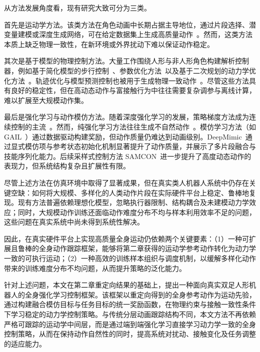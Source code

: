 从方法发展角度看，现有研究大致可分为三类。

首先是运动学方法。该类方法在角色动画中长期占据主导地位，通过片段选择、潜变量建模或深度生成网络，可在给定数据集上生成高质量动作~\cite{safonova2007construction,lee2010motion,agrawal2016task,ye2010synthesis,levine2012continuous}。然而，这类方法本质上缺乏物理一致性，在新环境或外界扰动下难以保证动作稳定。

其次是基于模型的物理控制方法。大量工作围绕人形与非人形角色构建解析控制器，例如基于简化模型的步行控制~\cite{yin2007simbicon,ye2010optimal,coros2010generalized}、参数优化方法~\cite{agrawal2013diverse,ha2014iterative,wang2012optimizing}以及基于二次规划的动力学优化方法~\cite{da2008simulation,lee2010data,lee2014locomotion}。轨迹优化与模型预测控制也被用于生成物理一致动作~\cite{mordatch2012discovery,hamalainen2015online,tassa2012synthesis,wampler2014generalizing}。尽管这些方法具有良好的稳定性，但在高动态动作与富接触行为中往往需要复杂调参与离线计算，难以扩展至大规模动作集。

最后是强化学习与动作模仿方法。随着深度强化学习的发展，策略梯度方法成为连续控制的主流~\cite{zhu2025reinforcement,schulman2017proximal,schulman2015trust,sutton1998introduction}。然而，纯强化学习方法往往生成不自然动作~\cite{merel2017learning,schulman2015high}。模仿学习方法（如 GAIL~\cite{ho2016generative}）通过数据驱动构建奖励，但动作质量仍难达到动画级别。DeepMimic~\cite{peng2018deepmimic}通过显式模仿项与参考状态初始化机制显著提升了动作质量，并展示了多片段融合与技能序列化能力。后续采样式控制方法 SAMCON~\cite{liu2016guided,liu2010sampling}进一步提升了高度动态动作的表现力，但系统结构复杂且扩展性有限。

尽管上述方法在仿真环境中取得了显著成果，但在真实类人机器人系统中仍存在关键空缺：如何将大规模、多样化的人类动作片段在实际硬件平台上稳定、鲁棒地复现\cite{tobin2017domain}。现有方法普遍依赖理想化模型，忽略执行器限制、结构耦合及未建模动力学效应\cite{herzog2016momentum,zhu2025reinforcement}；同时，大规模动作训练还面临动作难度分布不均与样本利用效率不足的问题，这些问题在真实系统中尚未得到系统性解决\cite{florensa2017reverse,peng2018deepmimic}。

因此，在真实硬件平台上实现高质量全身运动仍依赖两个关键要素：（1）一种可扩展且鲁棒的全身动作跟踪框架，能够将第二章获得的运动学参考动作转化为动力学一致的可执行运动；（2）一种高效的训练样本组织与调度机制，以缓解多样化动作带来的训练难度分布不均问题，从而提升策略的泛化能力。

针对上述问题，本文在第二章重定向结果的基础上，提出一种面向真实双足人形机器人的全身强化学习控制框架。该框架以重定向得到的全身参考动作为运动先验，通过构建融合模仿目标与任务目标的统一奖励函数，在物理约束与接触一致性条件下学习稳定的动力学控制策略。与传统分层动画跟踪结构不同，本文方法不再依赖严格可跟踪的运动学中间层，而是通过端到端强化学习直接学习动力学一致的全身控制策略，从而在保持动作自然性的同时，提高系统对扰动、接触变化及任务调整的适应能力。

